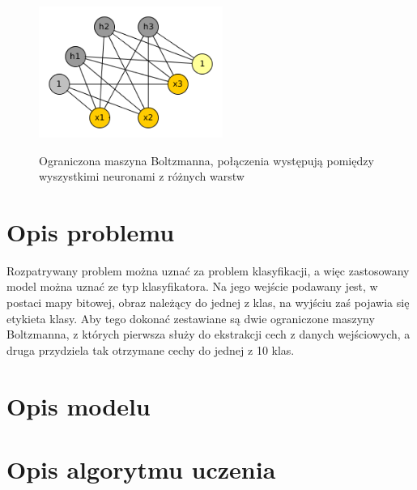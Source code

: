 \documentclass[a4paper,10pt]{article} %
\begin{document}
\begin{figure}
 \centering
 \includegraphics[width=6cm]{imgs/rbm.png}
 \label{fig:rbm}
\caption{Ograniczona maszyna Boltzmanna, połączenia występują pomiędzy wyszystkimi neuronami z różnych
warstw}
\end{figure} 

\section{Opis problemu}

Rozpatrywany problem można uznać za problem klasyfikacji, a więc zastosowany model można uznać ze typ klasyfikatora. Na jego wejście podawany jest, w postaci mapy bitowej, obraz należący do jednej z klas, na wyjściu zaś pojawia się etykieta klasy. Aby tego dokonać zestawiane są dwie ograniczone maszyny Boltzmanna, z których pierwsza służy do ekstrakcji cech z danych wejściowych, a druga przydziela tak otrzymane cechy do jednej z 10 klas.

\section{Opis modelu}

\section{Opis algorytmu uczenia}
\end{document}
